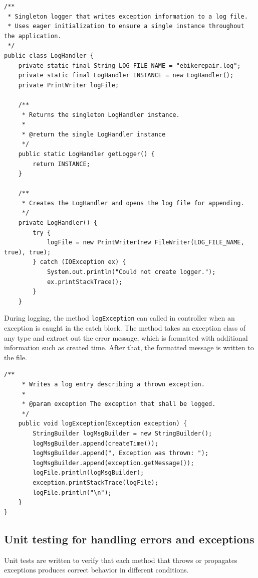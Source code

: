 \documentclass[a4paper]{scrartcl}
\begin{document}
\begin{lstlisting}[style=javastyle, caption={Log handler class applied with singleton pattern}]
/**
 * Singleton logger that writes exception information to a log file.
 * Uses eager initialization to ensure a single instance throughout the application.
 */
public class LogHandler {
    private static final String LOG_FILE_NAME = "ebikerepair.log";
    private static final LogHandler INSTANCE = new LogHandler();
    private PrintWriter logFile;

    /**
     * Returns the singleton LogHandler instance.
     *
     * @return the single LogHandler instance
     */
    public static LogHandler getLogger() {
        return INSTANCE;
    }

    /**
     * Creates the LogHandler and opens the log file for appending.
     */
    private LogHandler() {
        try {
            logFile = new PrintWriter(new FileWriter(LOG_FILE_NAME, true), true);
        } catch (IOException ex) {
            System.out.println("Could not create logger.");
            ex.printStackTrace();
        }
    }
\end{lstlisting}


During logging, the method \texttt{logException} can called in controller when an exception is caught in the catch block. The method takes an exception class of any type and extract out the error message, which is formatted with additional information such as created time. After that, the formatted message is written to the file.

\begin{lstlisting}[style=javastyle, caption={Log exception}]
    /**
     * Writes a log entry describing a thrown exception.
     * 
     * @param exception The exception that shall be logged.
     */
    public void logException(Exception exception) {
        StringBuilder logMsgBuilder = new StringBuilder();
        logMsgBuilder.append(createTime());
        logMsgBuilder.append(", Exception was thrown: ");
        logMsgBuilder.append(exception.getMessage());
        logFile.println(logMsgBuilder);
        exception.printStackTrace(logFile);
        logFile.println("\n");
    }
}
\end{lstlisting}

\subsection{Unit testing for handling errors and exceptions}

Unit tests are written to verify that each method that throws or propagates exceptions produces correct behavior in different conditions.
\end{document}
